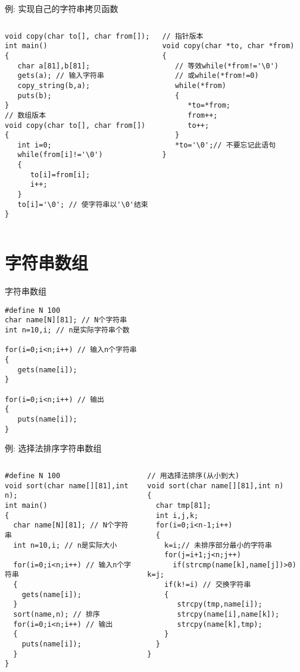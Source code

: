 \begin{frame}{例: 实现自己的字符串拷贝函数}
\vspace{-0.5cm}
\begin{columns}[T]
\begin{lstlisting}
void copy(char to[], char from[]);
int main()
{
   char a[81],b[81];
   gets(a); // 输入字符串
   copy_string(b,a);
   puts(b);
}
// 数组版本
void copy(char to[], char from[])
{
   int i=0;
   while(from[i]!='\0')
   {
      to[i]=from[i];
      i++;
   }
   to[i]='\0'; // 使字符串以'\0'结束
}
\end{lstlisting}
\begin{lstlisting}[frame=leftline]
// 指针版本
void copy(char *to, char *from)
{
   // 等效while(*from!='\0')
   // 或while(*from!=0)
   while(*from) 
   {
      *to=*from;
      from++;
      to++;
   }
   *to='\0';// 不要忘记此语句
}
\end{lstlisting}
\end{columns}
\medskip
\end{frame}

\section{字符串数组}

\begin{frame}{字符串数组}
\begin{lstlisting}
#define N 100
char name[N][81]; // N个字符串
int n=10,i; // n是实际字符串个数

for(i=0;i<n;i++) // 输入n个字符串
{
   gets(name[i]); 
}

for(i=0;i<n;i++) // 输出
{
   puts(name[i]);
}
\end{lstlisting}
\end{frame}

\begin{frame}{例: 选择法排序字符串数组}
\vspace{-0.5cm}
\begin{columns}[T]
\begin{lstlisting}
#define N 100
void sort(char name[][81],int n);
int main()
{
  char name[N][81]; // N个字符串
  int n=10,i; // n是实际大小

  for(i=0;i<n;i++) // 输入n个字符串
  {
    gets(name[i]); 
  }
  sort(name,n); // 排序
  for(i=0;i<n;i++) // 输出
  {
    puts(name[i]); 
  }
}
\end{lstlisting}
\begin{lstlisting}[frame=leftline]
// 用选择法排序(从小到大)
void sort(char name[][81],int n)
{
  char tmp[81];
  int i,j,k;
  for(i=0;i<n-1;i++)
  {
    k=i;// 未排序部分最小的字符串
    for(j=i+1;j<n;j++)
      if(strcmp(name[k],name[j])>0) k=j;
    if(k!=i) // 交换字符串
    {
       strcpy(tmp,name[i]); 
       strcpy(name[i],name[k]); 
       strcpy(name[k],tmp);
    }
  }
}
\end{lstlisting}
\end{columns}
~\\
\end{frame}

